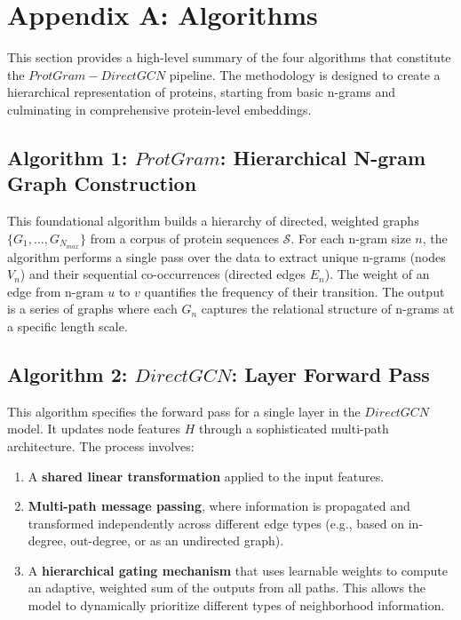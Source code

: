 \documentclass[utf8]{frontiers_suppmat}
\begin{document}
	\onecolumn
	\title[Supplementary Material]{{}}
	\maketitle
	
\section{Appendix A: Algorithms}
This section provides a high-level summary of the four algorithms that constitute the \textbf{$ProtGram-DirectGCN$} pipeline. The methodology is designed to create a hierarchical representation of proteins, starting from basic n-grams and culminating in comprehensive protein-level embeddings.

\subsection*{Algorithm 1: \textit{$ProtGram$}: Hierarchical N-gram Graph Construction}
This foundational algorithm builds a hierarchy of directed, weighted graphs $\{G_1, \dots, G_{N_{max}}\}$ from a corpus of protein sequences $\mathcal{S}$. For each n-gram size $n$, the algorithm performs a single pass over the data to extract unique n-grams (nodes $V_n$) and their sequential co-occurrences (directed edges $E_n$). The weight of an edge from n-gram $u$ to $v$ quantifies the frequency of their transition. The output is a series of graphs where each $G_n$ captures the relational structure of n-grams at a specific length scale.

\subsection*{Algorithm 2: \textit{$DirectGCN$}: Layer Forward Pass}
This algorithm specifies the forward pass for a single layer in the \textbf{$DirectGCN$} model. It updates node features $H$ through a sophisticated multi-path architecture. The process involves:
\begin{enumerate}
	\item A \textbf{shared linear transformation} applied to the input features.
	\item \textbf{Multi-path message passing}, where information is propagated and transformed independently across different edge types (e.g., based on in-degree, out-degree, or as an undirected graph).
	\item A \textbf{hierarchical gating mechanism} that uses learnable weights to compute an adaptive, weighted sum of the outputs from all paths. This allows the model to dynamically prioritize different types of neighborhood information.
\end{enumerate}
\end{document}
